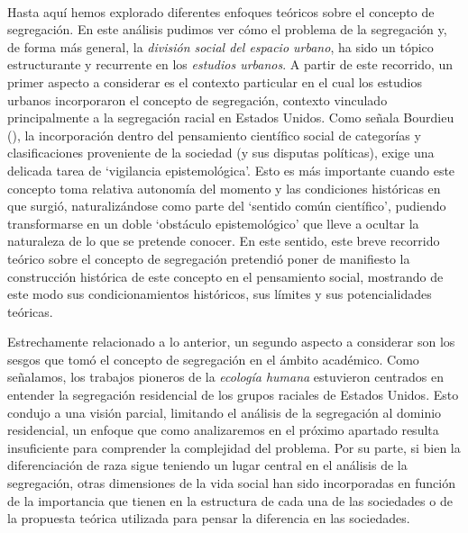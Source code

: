\documentclass[
  spanish,
  a4paper,%
  chapterprefix=true,%
  DIV=calc,%
  twoside]{scrbook}%
\begin{document}
~

Hasta aquí hemos explorado diferentes enfoques teóricos sobre el
concepto de segregación. En este análisis pudimos ver cómo el problema
de la segregación y, de forma más general, la \emph{división social del
espacio urbano}, ha sido un tópico estructurante y recurrente en los
\emph{estudios urbanos}. A partir de este recorrido, un primer aspecto a
considerar es el contexto particular en el cual los estudios urbanos
incorporaron el concepto de segregación, contexto vinculado
principalmente a la segregación racial en Estados Unidos. Como señala
Bourdieu (), la incorporación dentro del pensamiento científico social
de categorías y clasificaciones proveniente de la sociedad (y sus
disputas políticas), exige una delicada tarea de `vigilancia
epistemológica'. Esto es más importante cuando este concepto toma
relativa autonomía del momento y las condiciones históricas en que
surgió, naturalizándose como parte del `sentido común científico',
pudiendo transformarse en un doble `obstáculo epistemológico' que lleve
a ocultar la naturaleza de lo que se pretende conocer. En este sentido,
este breve recorrido teórico sobre el concepto de segregación pretendió
poner de manifiesto la construcción histórica de este concepto en el
pensamiento social, mostrando de este modo sus condicionamientos
históricos, sus límites y sus potencialidades teóricas.

Estrechamente relacionado a lo anterior, un segundo aspecto a considerar
son los sesgos que tomó el concepto de segregación en el ámbito
académico. Como señalamos, los trabajos pioneros de la \emph{ecología humana}
estuvieron centrados en entender la segregación residencial de los
grupos raciales de Estados Unidos. Esto condujo a una visión parcial,
limitando el análisis de la segregación al dominio residencial, un
enfoque que como analizaremos en el próximo apartado resulta
insuficiente para comprender la complejidad del problema. Por su parte,
si bien la diferenciación de raza sigue teniendo un lugar central en el
análisis de la segregación, otras dimensiones de la vida social han sido
incorporadas en función de la importancia que tienen en la estructura de
cada una de las sociedades o de la propuesta teórica utilizada para
pensar la diferencia en las sociedades.
\end{document}
